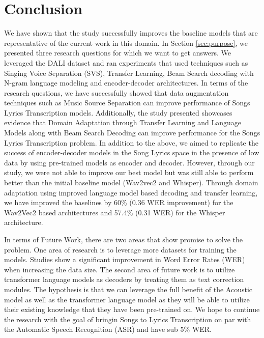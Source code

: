 
\chapter{Conclusion}%
\label{sec:conclusion}

We have shown that the study successfully improves the baseline models that are representative of the current work in this domain. In Section \ref{sec:purpose}, we presented three research questions for which we want to get answers. We leveraged the DALI dataset and ran experiments that used techniques such as Singing Voice Separation (SVS), Transfer Learning, Beam Search decoding with N-gram language modeling and encoder-decoder architectures. In terms of the research questions, we have successfully showed that data augmentation techniques such as Music Source Separation can improve performance of Songs Lyrics Transcription models. Additionally, the study presented showcases evidence that Domain Adaptation through Transfer Learning and Language Models along with Beam Search Decoding can improve performance for the Songs Lyrics Transcription problem. In addition to the above, we aimed to replicate the success of encoder-decoder models in the Song Lyrics space in the presence of low data by using pre-trained models as encoder and decoder. However, through our study, we were not able to improve our best model but was still able to perform better than the initial baseline model (Wav2vec2 and Whisper). Through domain adaptation using improved language model based decoding and transfer learning, we have improved the baselines by 60\% (0.36 WER improvement) for the Wav2Vec2 based architectures and 57.4\% (0.31 WER) for the Whisper architecture.


In terms of Future Work, there are two areas that show promise to solve the problem. One area of research is to leverage more datasets for training the models. Studies \cite{radford2023robust} \cite{xu2021self} \cite{ou2022transfer} show a significant improvement in Word Error Rates (WER) when increasing the data size. The second area of future work is to utilize transformer language models as decoders by treating them as text correction modules. The hypothesis is that we can leverage the full benefit of the Acoustic model as well as the transformer language model as they will be able to utilize their existing knowledge that they have been pre-trained on. We hope to continue the research with the goal of bringin Songs to Lyrics Transcription on par with the Automatic Speech Recognition (ASR) and have sub 5\% WER.
